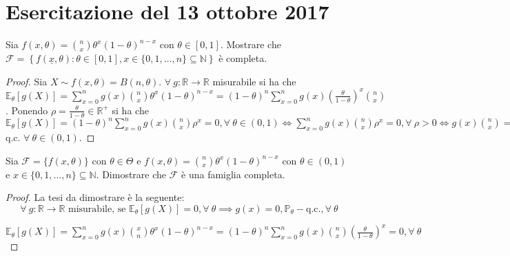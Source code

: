 \documentclass[hidelinks, 10pt]{report}
\begin{document}
\section{Esercitazione del 13 ottobre 2017}
\begin{ex}
Sia $ f(x, \theta) = \binom{n}{x} \theta^{x} (1 - \theta)^{n - x} $ con $ \theta \in [0,1] $. Mostrare che $ \mathcal{F} = \left\{ f(\underline{x}, \theta) : \theta \in [0, 1], x \in \{ 0, 1, \dotsc, n \} \subseteq \mathbb{N} \right\} $ \`e completa.
\end{ex}

\begin{proof}
Sia $ X \sim f(x, \theta) = B(n, \theta) $. $ \forall\ g: \mathbb{R} \to \mathbb{R} $ misurabile si ha che $ \mathbb{E}_{\theta} [g(X)] = \sum\limits_{x = 0}^{n} g(x) \binom{n}{x} \theta^{x} (1 - \theta)^{n - x} = (1 - \theta)^{n} \sum\limits_{x = 0}^{n} g(x) \left( \frac{\theta}{1 - \theta} \right)^x \binom{n}{x} $. Ponendo $ \rho = \frac{\theta}{1 - \theta} \in \mathbb{R}^{+} $ si ha che $ \mathbb{E}_{\theta} [g(X)] = (1 - \theta)^{n} \sum\limits_{x = 0}^{n} g(x) \binom{n}{x} \rho^{x} = 0, \forall\ \theta \in (0,1) \iff \sum\limits_{x = 0}^{n} g(x) \binom{n}{x} \rho^x = 0, \forall\ \rho > 0 \iff g(x) \binom{n}{x} = 0, \forall\ x \in \{ 0, 1, \dotsc, n \} \subseteq \mathbb{N} \iff g(x) = 0, \forall\ x \in \{ 0, 1, \dotsc, n \} \implies g(x) = 0, \mathbb{P}_{\theta} $ q.c. $ \forall\ \theta \in (0,1) $.
\end{proof}

\begin{ex}
Sia $ \mathcal{F} = \{ f(x, \theta) \} $ con $ \theta \in \Theta $ e $ f(x, \theta) = \binom{n}{x} \theta^{x} (1 - \theta)^{n - x} $ con $ \theta \in (0, 1) $ e $ x \in \{ 0, 1, \dotsc, n \} \subseteq \mathbb{N} $. Dimostrare che $ \mathcal{F} $ \`e una famiglia completa.
\end{ex}

\begin{proof}
La tesi da dimostrare \`e la seguente:
\[ \forall\ g : \mathbb{R} \to \mathbb{R} \text{ misurabile, se } \mathbb{E}_{\theta} [g(X)] = 0, \forall\ \theta \implies g(x) = 0, \mathbb{P}_{\theta}-\text{q.c.}, \forall\ \theta  \]

$ \mathbb{E}_{\theta} [g(X)] = \sum\limits_{x = 0}^{n} g(x) \binom{x}{n} \theta^{x} (1 - \theta)^{n - x} = (1 - \theta)^{n} \sum\limits_{x = 0}^{n} g(x) \binom{n}{x} \left( \frac{\theta}{1 - \theta} \right)^{x} = 0, \forall\ \theta $
\end{proof}
\end{document}
